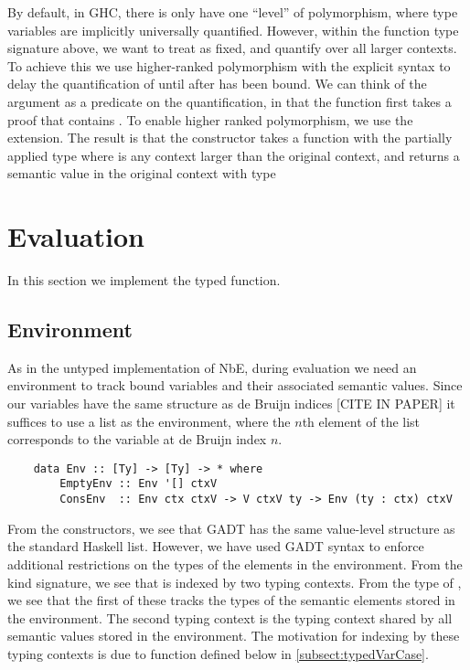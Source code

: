 By default, in GHC, there is only have one “level” of polymorphism, where type variables are implicitly universally quantified. However, within the function type signature above, we want to treat  as fixed, and quantify over all larger contexts. To achieve this we use higher-ranked polymorphism with the explicit  syntax to delay the quantification of  until after  has been bound. We can think of the  argument as a predicate on the quantification, in that the function first takes a proof that  contains . To enable higher ranked polymorphism, we use the  extension. The result is that the  constructor takes a function with the partially applied type  where  is any context larger than the original context, and returns a semantic value in the original context with type 


\section{Evaluation}

In this section we implement the typed  function.

\subsection{Environment}

As in the untyped implementation of NbE, during evaluation we need an environment to track bound variables and their associated semantic values. Since our variables have the same structure as de Bruijn indices [CITE IN PAPER] it suffices to use a list as the environment, where the $n$th element of the list corresponds to the variable at de Bruijn index $n$.


\begin{lstlisting}
    data Env :: [Ty] -> [Ty] -> * where
        EmptyEnv :: Env '[] ctxV
        ConsEnv  :: Env ctx ctxV -> V ctxV ty -> Env (ty : ctx) ctxV
\end{lstlisting}

From the constructors, we see that  GADT has the same value-level structure as the standard Haskell list. However, we have used GADT syntax to enforce additional restrictions on the types of the elements in the environment. From the kind signature, we see that  is indexed by two typing contexts. From the type of , we see that the first of these tracks the types of the semantic elements stored in the environment. The second typing context is the typing context shared by all semantic values stored in the environment. The motivation for indexing  by these typing contexts is due to  function defined below in \ref{subsect:typedVarCase}.


